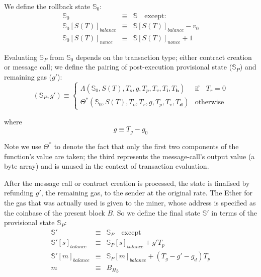 \documentclass[9pt,oneside]{amsart}
\begin{document}
\begin{multicols}{2}
We define the rollback state $\mathbb{S}_0$:
\begin{eqnarray}
\mathbb{S}_0 & \equiv & \mathbb{S} \quad \text{except:} \\
\mathbb{S}_0[S(T)]_{balance} & \equiv & \mathbb{S}[S(T)]_{balance} - v_0 \\
\mathbb{S}_0[S(T)]_{nonce} & \equiv & \mathbb{S}[S(T)]_{nonce} + 1
\end{eqnarray}

Evaluating $\mathbb{S}_P$ from $\mathbb{S}_0$ depends on the transaction type; either contract creation or message call; we define the pairing of post-execution provisional state ($\mathbb{S}_P$) and remaining gas ($g'$):
\begin{equation}
(\mathbb{S}_P, g') \equiv \begin{cases}
\Lambda(\mathbb{S}_0, S(T), T_o, g, T_p, T_v, T_\mathbf{i}, T_\mathbf{b}) & \text{if} \quad T_r = 0 \\
\Theta^*(\mathbb{S}_0, S(T), T_o, T_r, g, T_p, T_v, T_\mathbf{d}) & \text{otherwise}
\end{cases}
\end{equation}

where
\begin{equation}
g \equiv T_g - g_0
\end{equation}

Note we use $\Theta^*$ to denote the fact that only the first two components of the function's value are taken; the third represents the message-call's output value (a byte array) and is unused in the context of transaction evaluation.

After the message call or contract creation is processed, the state is finalised by refunding $g'$, the remaining gas, to the sender at the original rate. The Ether for the gas that was actually used is given to the miner, whose address is specified as the coinbase of the present block $B$. So we define the final state $\mathbb{S}'$ in terms of the provisional state $\mathbb{S}_P$:
\begin{eqnarray}
\mathbb{S}' & \equiv & \mathbb{S}_P \quad \text{except} \\
\mathbb{S}'[s]_{balance} & \equiv & \mathbb{S}_P[s]_{balance} + g' T_p \\
\mathbb{S}'[m]_{balance} & \equiv & \mathbb{S}_P[m]_{balance} + (T_g - g' - g_d) T_p \\
m & \equiv & {B_H}_b
\end{eqnarray}



\end{multicols}
\end{document}
